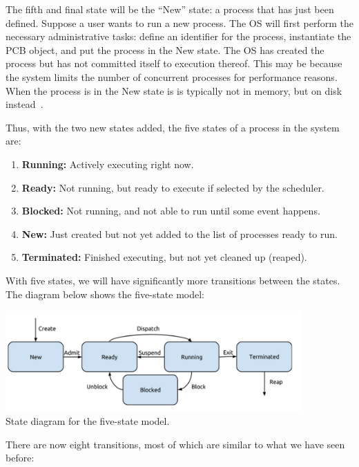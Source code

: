 The fifth and final state will be the ``New'' state: a process that has just been defined. Suppose a user wants to run a new process. The OS will first perform the necessary administrative tasks: define an identifier for the process, instantiate the PCB object, and put the process in the New state. The OS has created the process but has not committed itself to execution thereof. This may be because the system limits the number of concurrent processes for performance reasons. When the process is in the New state is is typically not in memory, but on disk instead~\cite{osi}.

Thus, with the two new states added, the five states of a process in the system are:

\begin{enumerate}
 \item \textbf{Running:} Actively executing right now.
 \item \textbf{Ready:} Not running, but ready to execute if selected by the scheduler.
 \item \textbf{Blocked:} Not running, and not able to run until some event happens.
 \item \textbf{New:} Just created but not yet added to the list of processes ready to run.
 \item \textbf{Terminated:} Finished executing, but not yet cleaned up (reaped).
\end{enumerate}

With five states, we will have significantly more transitions between the states. The diagram below shows the five-state model:

\begin{center}
\includegraphics[width=0.85\textwidth]{images/5-state-model.png}\\
State diagram for the five-state model.
\end{center}

There are now eight transitions, most of which are similar to what we have seen before:

